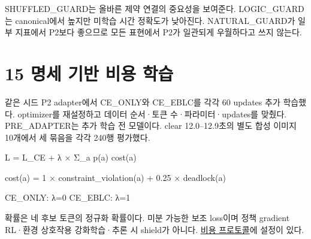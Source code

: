 \documentclass[11pt,a4paper]{article}
\begin{document}
SHUFFLED\_\allowbreak{}GUARD는 올바른 제약 연결의 중요성을 보여준다. LOGIC\_\allowbreak{}GUARD는 canonical에서 높지만 미학습 시간 정확도가 낮아진다. NATURAL\_\allowbreak{}GUARD가 일부 지표에서 P2보다 좋으므로 모든 표현에서 P2가 일관되게 우월하다고 쓰지 않는다.\par

\clearpage{}\section*{15 명세 기반 비용 학습}

같은 시드 P2 adapter에서 CE\_\allowbreak{}ONLY와 CE\_\allowbreak{}EBLC를 각각 60 updates 추가 학습했다. optimizer를 재설정하고 데이터 순서·토큰 수·파라미터·updates를 맞췄다. PRE\_\allowbreak{}ADAPTER는 추가 학습 전 모델이다. clear 12.0–12.9초의 별도 합성 이미지 10개에서 세 묶음을 각각 240행 평가했다.\par

\begingroup\small\ttfamily\setlength{\parskip}{1pt}
\noindent\hspace*{0.0em}L = L\_\allowbreak{}CE + λ × Σ\_\allowbreak{}a p(a) cost(a)\par
\noindent\hspace*{0.0em}cost(a) = 1 × constraint\_\allowbreak{}violation(a) + 0.25 × deadlock(a)\par
\noindent\hspace*{0.0em}CE\_\allowbreak{}ONLY: λ=0       CE\_\allowbreak{}EBLC: λ=1\par\endgroup\par

확률은 네 후보 토큰의 정규화 확률이다. 미분 가능한 보조 loss이며 정책 gradient RL·환경 상호작용 강화학습·추론 시 shield가 아니다. \href{\detokenize{../temporal-cost-protocol-2026-09-29-001/protocol.json}}{비용 프로토콜}에 설정이 있다.\par
\end{document}

